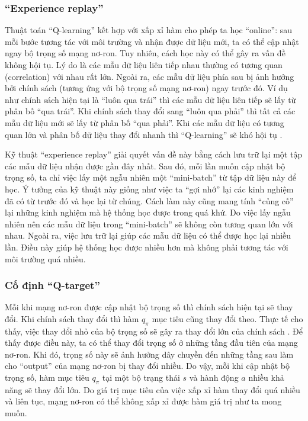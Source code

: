 \subsubsection*{``Experience replay''}
	Thuật toán ``Q-learning'' kết hợp với xấp xỉ hàm cho phép ta học ``online'': sau mỗi bước tương tác với môi trường và nhận được dữ liệu mới, ta có thể cập nhật ngay bộ trọng số mạng nơ-ron.
	Tuy nhiên, cách học này có thể gây ra vấn đề không hội tụ.
	Lý do là các mẫu dữ liệu liên tiếp nhau thường có tương quan (correlation) với nhau rất lớn.
	Ngoài ra, các mẫu dữ liệu phía sau bị ảnh hưởng bởi chính sách (tương ứng với bộ trọng số mạng nơ-ron) ngay trước đó.
	Ví dụ như chính sách hiện tại là ``luôn qua trái'' thì các mẫu dữ liệu liên tiếp sẽ lấy từ phân bố ``qua trái''.
	Khi chính sách thay đổi sang ``luôn qua phải'' thì tất cả các mẫu dữ liệu mới sẽ lấy từ phân bố ``qua phải''.
	Khi các mẫu dữ liệu có tương quan lớn và phân bố dữ liệu thay đổi nhanh thì ``Q-learning'' sẽ khó hội tụ \cite{mnihdqn2015}.
	
	Kỹ thuật ``experience replay'' \cite{lin1993reinforcement} giải quyết vấn đề này bằng cách lưu trữ lại một tập các mẫu dữ liệu nhận được gần đây nhất.
	Sau đó, mỗi lần muốn cập nhật bộ trọng số, ta chỉ việc lấy một ngẫu nhiên một ``mini-batch'' từ tập dữ liệu này để học.
	Ý tưởng của kỹ thuật này giống như việc ta ``gợi nhớ'' lại các kinh nghiệm đã có từ trước đó và học lại từ chúng.
	Cách làm này cũng mang tính ``củng cố'' lại những kinh nghiệm mà hệ thống học được trong quá khứ.
	Do việc lấy ngẫu nhiên nên các mẫu dữ liệu trong ``mini-batch'' sẽ không còn tương quan lớn với nhau.
	Ngoài ra, việc lưu trữ lại giúp các mẫu dữ liệu có thể được học lại nhiều lần.
	Điều này giúp hệ thống học được nhiều hơn mà không phải tương tác với môi trường quá nhiều.
	
\subsubsection*{Cố định ``Q-target''}
	Mỗi khi mạng nơ-ron được cập nhật bộ trọng số thì chính sách hiện tại sẽ thay đổi.
	Khi chính sách thay đổi thì hàm $q_{\pi}$ mục tiêu cũng thay đổi theo.
	Thực tế cho thấy, việc thay đổi nhỏ của bộ trọng số sẽ gây ra thay đổi lớn của chính sách \cite{mnih2013playing}.
	Để thấy được điều này, ta có thể thay đổi trọng số ở những tầng đầu tiên của mạng nơ-ron.
	Khi đó, trọng số này sẽ ảnh hưởng dây chuyền đến những tầng sau làm cho ``output'' của mạng nơ-ron bị thay đổi nhiều.
	Do vậy, mỗi khi cập nhật bộ trọng số, hàm mục tiêu $q_{\pi}$ tại một bộ trạng thái $s$ và hành động $a$ nhiều khả năng sẽ thay đổi lớn.
	Do giá trị mục tiêu của việc xấp xỉ hàm thay đổi quá nhiều và liên tục, mạng nơ-ron có thể không xấp xỉ được hàm giá trị như ta mong muốn.
	
